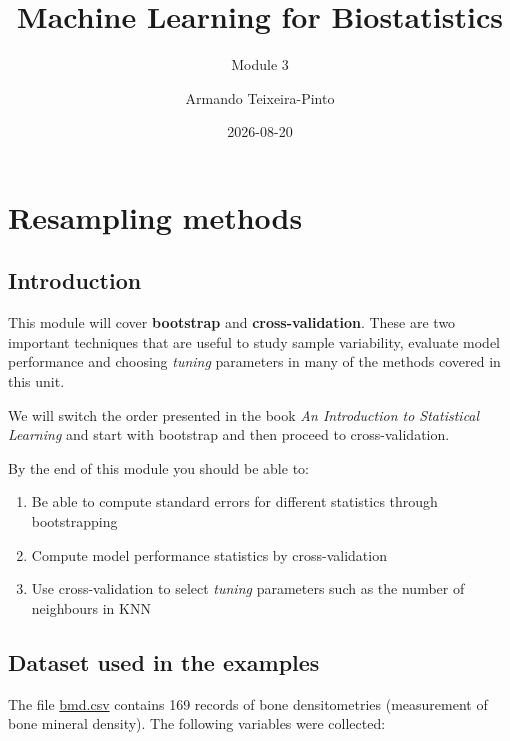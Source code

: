 \documentclass[
]{book}
\title{Machine Learning for Biostatistics}
\subtitle{Module 3}
\author{Armando Teixeira-Pinto}
\date{2026-08-20}
\providecommand{\tightlist}{%
  \setlength{\itemsep}{0pt}\setlength{\parskip}{0pt}}
\begin{document}
\maketitle

{
\setcounter{tocdepth}{1}
\tableofcontents
}
\chapter*{Resampling methods}\label{resampling-methods}

\section*{Introduction}\label{introduction}

This module will cover \textbf{bootstrap} and \textbf{cross-validation}. These are two
important techniques that are useful to study sample variability, evaluate
model performance and choosing \emph{tuning} parameters in many of the methods
covered in this unit.

We will switch the order presented in the book \emph{An Introduction to Statistical
Learning} and start with bootstrap and then proceed to cross-validation.

By the end of this module you should be able to:

\begin{enumerate}
\def\labelenumi{\arabic{enumi}.}
\tightlist
\item
  Be able to compute standard errors for different statistics
  through bootstrapping
\item
  Compute model performance statistics by cross-validation
\item
  Use cross-validation to select \emph{tuning} parameters such
  as the number of neighbours in KNN
\end{enumerate}

\section*{Dataset used in the examples}\label{dataset-used-in-the-examples}

The file \href{https://www.dropbox.com/s/7wjsfdaf0wt2kg2/bmd.csv?dl=1}{bmd.csv}
contains 169 records of bone densitometries (measurement of
bone mineral density). The following variables were collected:
\end{document}
